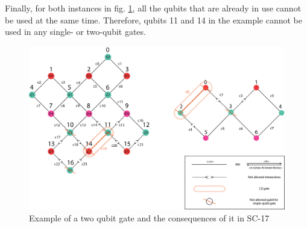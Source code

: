 Finally, for both instances in fig. \ref{fig:two_qubit_gate_ex}, all the qubits that are already in use cannot be used at the same time. Therefore, qubits 11 and 14 in the example cannot be used in any single- or two-qubit gates.



\begin{figure}[h!]
\centering
\includegraphics[width=\textwidth]{figures/two_qubit_constraint_sc17_w_cnnct.png}
\caption{\label{fig:two_qubit_gate_ex}
Example of a two qubit gate and the consequences of it in SC-17}
\end{figure}



     
     

